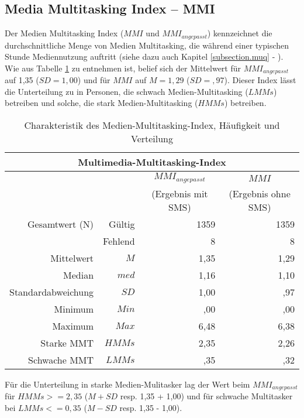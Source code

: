 \subsection{Media Multitasking Index -- MMI}
Der Medien Multitasking Index ($MMI$ und $MMI_{angepasst}$) kennzeichnet die durchschnittliche Menge von Medien Multitasking, die während einer typischen Stunde Mediennutzung auftritt (siehe dazu auch Kapitel \ref{subsection.muq} - ). Wie aus Tabelle \ref{table.deskrptMedien} zu entnehmen ist, belief sich der Mittelwert für $MMI_{angepasst}$ auf 1,35 ($SD =  1,00$) und für $MMI$ auf $M = 1,29$ ($SD = ,97$). Dieser Index lässt die Unterteilung zu in Personen, die schwach Medien-Multitasking ($LMMs$) betreiben und solche, die stark Medien-Multitasking ($HMMs$) betreiben.\\
\begin{table}[ht] 
    \centering
    \caption{Charakteristik des Medien-Multitasking-Index, Häufigkeit und Verteilung}
    \begin{tabular}[t]{|r r|r|r|} 
        \hline
        \multicolumn{4}{|c|}{\textbf{Multimedia-Multitasking-Index}}\\ 
        \hline       
        \multicolumn{2}{|c}{} & \multicolumn{1}{c|}{$MMI_{angepasst}$} & \multicolumn{1}{|c|}{$MMI$}\\
        \multicolumn{2}{|c}{} & \multicolumn{1}{c|}{(Ergebnis mit SMS)} & \multicolumn{1}{|c|}{(Ergebnis ohne SMS)}\\
        \hline
        Gesamtwert (N) & Gültig & 1359 & 1359\\
        & Fehlend & 8 & 8\\
        Mittelwert & $M$ & 1,35 & 1,29\\
        Median & $med$ & 1,16 & 1,10\\
        Standardabweichung & $SD$ & 1,00 & ,97\\
        Minimum & $Min$ & ,00 & ,00\\
        Maximum & $Max$ & 6,48 & 6,38\\
        Starke MMT & $HMMs$ & 2,35 & 2,26\\
        Schwache MMT & $LMMs$ & ,35 & ,32\\
        \hline
    \end{tabular}
    \label{table.deskrptMedien}
\end{table}
Für die Unterteilung in starke Medien-Mulitasker lag der Wert beim $MMI_{angepasst}$ für $HMMs >= 2,35$ ($M + SD$ resp. 1,35 + 1,00) und für schwache Multitasker bei $LMMs <= 0,35$ ($M - SD$ resp. 1,35 - 1,00). \\
